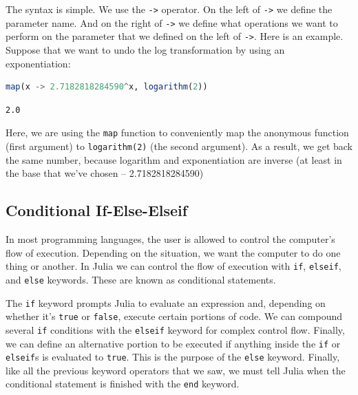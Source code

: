 \documentclass[
  notoc %
]{tufte-book}
\newcommand{\passthrough}[1]{#1}
\begin{document}
The syntax is simple. We use the \passthrough{\lstinline!->!} operator.
On the left of \passthrough{\lstinline!->!} we define the parameter
name. And on the right of \passthrough{\lstinline!->!} we define what
operations we want to perform on the parameter that we defined on the
left of \passthrough{\lstinline!->!}. Here is an example. Suppose that
we want to undo the log transformation by using an exponentiation:

\begin{lstlisting}[language=Julia]
map(x -> 2.7182818284590^x, logarithm(2))
\end{lstlisting}

\begin{lstlisting}[language=Output]
2.0
\end{lstlisting}

Here, we are using the \passthrough{\lstinline!map!} function to
conveniently map the anonymous function (first argument) to
\passthrough{\lstinline!logarithm(2)!} (the second argument). As a
result, we get back the same number, because logarithm and
exponentiation are inverse (at least in the base that we've chosen --
2.7182818284590)

\hypertarget{sec:conditionals}{%
\subsection{Conditional If-Else-Elseif}\label{sec:conditionals}}

In most programming languages, the user is allowed to control the
computer's flow of execution. Depending on the situation, we want the
computer to do one thing or another. In Julia we can control the flow of
execution with \passthrough{\lstinline!if!},
\passthrough{\lstinline!elseif!}, and \passthrough{\lstinline!else!}
keywords. These are known as conditional statements.

The \passthrough{\lstinline!if!} keyword prompts Julia to evaluate an
expression and, depending on whether it's \passthrough{\lstinline!true!}
or \passthrough{\lstinline!false!}, execute certain portions of code. We
can compound several \passthrough{\lstinline!if!} conditions with the
\passthrough{\lstinline!elseif!} keyword for complex control flow.
Finally, we can define an alternative portion to be executed if anything
inside the \passthrough{\lstinline!if!} or
\passthrough{\lstinline!elseif!}s is evaluated to
\passthrough{\lstinline!true!}. This is the purpose of the
\passthrough{\lstinline!else!} keyword. Finally, like all the previous
keyword operators that we saw, we must tell Julia when the conditional
statement is finished with the \passthrough{\lstinline!end!} keyword.
\end{document}
